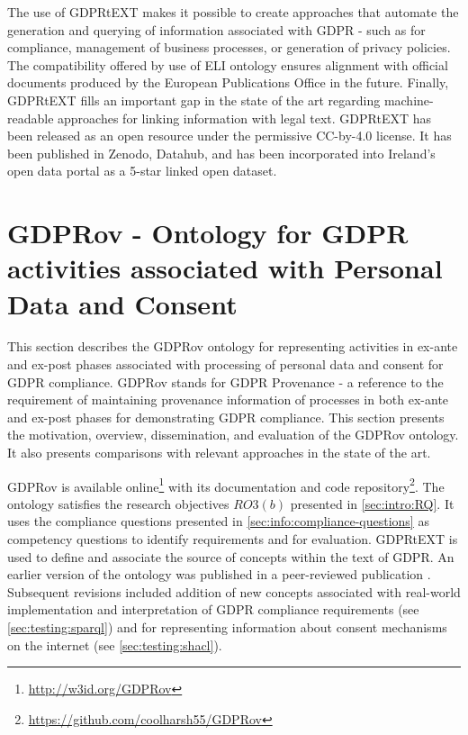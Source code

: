 The use of GDPRtEXT makes it possible to create approaches that automate the generation and querying of information associated with GDPR - such as for compliance, management of business processes, or generation of privacy policies. The compatibility offered by use of ELI ontology ensures alignment with official documents produced by the European Publications Office in the future.
Finally, GDPRtEXT fills an important gap in the state of the art regarding machine-readable approaches for linking information with legal text.
GDPRtEXT has been released as an open resource under the permissive CC-by-4.0 license. It has been published in Zenodo, Datahub, and has been incorporated into Ireland’s open data portal as a 5-star linked open dataset.

\section{GDPRov - Ontology for GDPR activities associated with Personal Data and Consent}\label{sec:voc:GDPRov}
This section describes the GDPRov ontology for representing activities in ex-ante and ex-post phases associated with processing of personal data and consent for GDPR compliance. GDPRov stands for GDPR Provenance - a reference to the requirement of maintaining provenance information of processes in both ex-ante and ex-post phases for demonstrating GDPR compliance. This section presents the motivation, overview, dissemination, and evaluation of the GDPRov ontology. It also presents comparisons with relevant approaches in the state of the art. 

GDPRov is available online\footnote{\url{http://w3id.org/GDPRov}} with its documentation and code repository\footnote{\url{https://github.com/coolharsh55/GDPRov}}.
The ontology satisfies the research objectives $RO3(b)$ presented in \autoref{sec:intro:RQ}.
It uses the compliance questions presented in \autoref{sec:info:compliance-questions} as competency questions to identify requirements and for evaluation.
GDPRtEXT is used to define and associate the source of concepts within the text of GDPR.
An earlier version of the ontology was published in a peer-reviewed publication \cite{pandit_modelling_2017}.
Subsequent revisions included addition of new concepts associated with real-world implementation and interpretation of GDPR compliance requirements (see \autoref{sec:testing:sparql}) and for representing information about consent mechanisms on the internet (see \autoref{sec:testing:shacl}).

